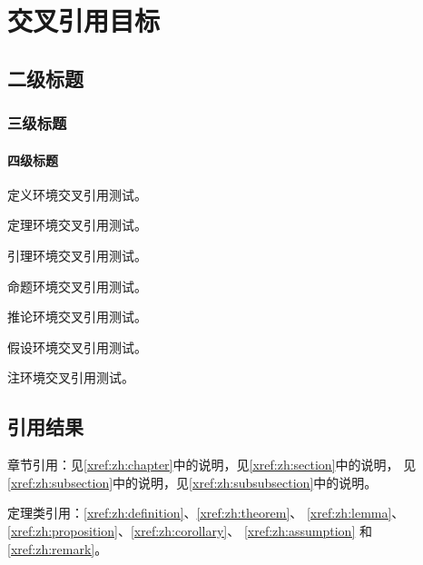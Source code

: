 \documentclass{uestcthesis}
\begin{document}
\uestcfrontmatter
\uestctableofcontents
\uestcmainmatter

\chapter{交叉引用目标}\label{xref:zh:chapter}
\section{二级标题}\label{xref:zh:section}
\subsection{三级标题}\label{xref:zh:subsection}
\subsubsection{四级标题}\label{xref:zh:subsubsection}

\begin{definition}\label{xref:zh:definition}
定义环境交叉引用测试。
\end{definition}
\begin{theorem}\label{xref:zh:theorem}
定理环境交叉引用测试。
\end{theorem}
\begin{lemma}\label{xref:zh:lemma}
引理环境交叉引用测试。
\end{lemma}
\begin{proposition}\label{xref:zh:proposition}
命题环境交叉引用测试。
\end{proposition}
\begin{corollary}\label{xref:zh:corollary}
推论环境交叉引用测试。
\end{corollary}
\begin{assumption}\label{xref:zh:assumption}
假设环境交叉引用测试。
\end{assumption}
\begin{remark}\label{xref:zh:remark}
注环境交叉引用测试。
\end{remark}

\clearpage
\section{引用结果}

章节引用：见\autoref{xref:zh:chapter}中的说明，见\autoref{xref:zh:section}中的说明，
见\autoref{xref:zh:subsection}中的说明，见\autoref{xref:zh:subsubsection}中的说明。

定理类引用：\autoref{xref:zh:definition}、\autoref{xref:zh:theorem}、
\autoref{xref:zh:lemma}、\autoref{xref:zh:proposition}、\autoref{xref:zh:corollary}、
\autoref{xref:zh:assumption} 和\autoref{xref:zh:remark}。
\end{document}
